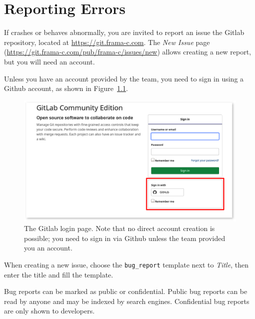 \chapter{Reporting Errors}
\label{user-errors}

If \FramaC crashes or behaves abnormally, you are invited to report an issue
\via the \FramaC Gitlab repository, located at \url{https://git.frama-c.com}.
The {\em New Issue} page (\url{https://git.frama-c.com/pub/frama-c/issues/new})
allows creating a new report, but you will need an account.

\begin{important}
  Unless you have an account provided by the \FramaC team, you need to sign in
  using a Github account, as shown in Figure~\ref{fig:gitlab-login}.
\end{important}

\begin{figure}[htbp]
\begin{center}
\includegraphics[width=\textwidth]{gitlab-login.png}
\end{center}
\caption{The \FramaC Gitlab login page. Note that no direct account creation
  is possible; you need to sign in via Github unless the \FramaC team
  provided you an account.}
\label{fig:gitlab-login}
\end{figure}

When creating a new issue, choose the \texttt{bug\_report} template next to
{\em Title}, then enter the title and fill the template.

Bug reports can be marked as public or confidential.
Public bug reports can be read by anyone and may be indexed by search
engines. Confidential bug reports are only shown to \FramaC developers.

